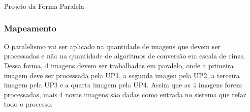 \begin{subsection}{Projeto da Forma Paralela}
\subsubsection{Mapeamento}

O paralelismo vai ser aplicado na quantidade de imagens que devem ser
processadas e não na quantidade de algoritmos de conversão em escala de cinza.
Dessa forma, 4 imagens devem ser trabalhadas em paralelo, onde a primeira imagem
deve ser processada pela UP1, a segunda imagen pela UP2, a terceira imagem pela
UP3 e a quarta imagem pela UP4. Assim que as 4 imagens forem processadas, mais
4 novas imagens são dadas como entrada no sistema que refaz todo o processo.
\end{subsection}




